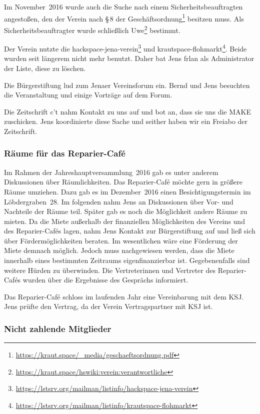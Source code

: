 \documentclass[ngerman]{scrartcl}
\begin{document}
Im November~2016 wurde auch die Suche nach einem Sicherheitsbeauftragten
angestoßen, den der Verein nach §\,8 der
Geschäftsordnung\footnote{\url{https://kraut.space/_media/geschaeftsordnung.pdf}}
besitzen muss. Als Sicherheitsbeauftragter wurde schließlich
Uwe\footnote{\url{https://kraut.space/hswiki:verein:verantwortliche}} bestimmt.

Der Verein nutzte die
hackspace-jena-verein\footnote{\url{https://lstsrv.org/mailman/listinfo/hackspace-jena-verein}}
und
krautspace-flohmarkt\footnote{\url{https://lstsrv.org/mailman/listinfo/krautspace-flohmarkt}}. Beide
wurden seit längerem nicht mehr benutzt. Daher bat Jens frlan als Administrator
der Liste, diese zu löschen.

Die Bürgerstiftung lud zum Jenaer Vereinsforum ein. Bernd und Jens besuchten die
Veranstaltung und einige Vorträge auf dem Forum.

Die Zeitschrift c't nahm Kontakt zu uns auf und bot an, dass sie uns die MAKE
zuschicken. Jens koordinierte diese Sache und seither haben wir ein Freiabo der
Zeitschrift.


\subsubsection{Räume für das Reparier-Café}
\label{sec:raumrc}

Im Rahmen der Jahreshauptversammlung~2016 gab es unter anderem Diskussionen über
Räumlichkeiten. Das Reparier-Café möchte gern in größere Räume umziehen. Dazu
gab es im Dezember~2016 einen Besichtigungstermin im Löbdergraben~28. Im
folgenden nahm Jens an Diskussionen über Vor- und Nachteile der Räume
teil. Später gab es noch die Möglichkeit andere Räume zu mieten. Da die Miete
außerhalb der finanziellen Möglichkeiten des Vereins und des Reparier-Cafés
lagen, nahm Jens Kontakt zur Bürgerstiftung auf und ließ sich über
Fördermöglichkeiten beraten. Im wesentlichen wäre eine Förderung der Miete
demnach möglich. Jedoch muss nachgewiesen werden, dass die Miete innerhalb eines
bestimmten Zeitraums eigenfinanzierbar ist. Gegebenenfalls sind weitere Hürden
zu überwinden. Die Vertreterinnen und Vertreter des Reparier-Cafés wurden über
die Ergebnisse des Gesprächs informiert.

Das Reparier-Café schloss im laufenden Jahr eine Vereinbarung mit dem KSJ. Jens
prüfte den Vertrag, da der Verein Vertragspartner mit KSJ ist. 

\subsubsection{Nicht zahlende Mitglieder}
\end{document}

